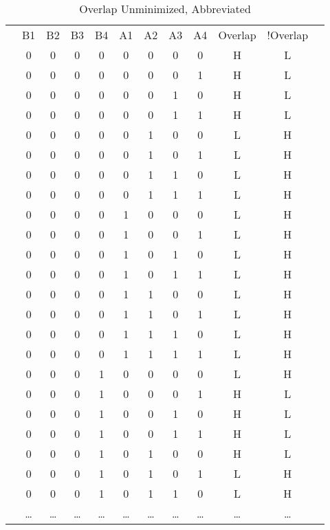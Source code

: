 \documentclass[letterpaper,titlepage,oneside]{article}
\begin{document}
\begin{table}[h!]
\begin{center}
\begin{tabular}{c|c|c|c|c|c|c|c|c|c|c|c}
\cline{2-11}

 & B1 & B2 & B3 & B4 & A1 & A2 & A3 & A4 & Overlap & !Overlap & \\ \cline{2-11}
 & 0 & 0 & 0 & 0 & 0 & 0 & 0 & 0 & H & L &   \\
 & 0 & 0 & 0 & 0 & 0 & 0 & 0 & 1 & H & L &   \\
 & 0 & 0 & 0 & 0 & 0 & 0 & 1 & 0 & H & L &   \\
 & 0 & 0 & 0 & 0 & 0 & 0 & 1 & 1 & H & L &   \\
 & 0 & 0 & 0 & 0 & 0 & 1 & 0 & 0 & L & H &   \\
 & 0 & 0 & 0 & 0 & 0 & 1 & 0 & 1 & L & H &   \\
 & 0 & 0 & 0 & 0 & 0 & 1 & 1 & 0 & L & H &   \\
 & 0 & 0 & 0 & 0 & 0 & 1 & 1 & 1 & L & H &   \\
 & 0 & 0 & 0 & 0 & 1 & 0 & 0 & 0 & L & H &   \\
 & 0 & 0 & 0 & 0 & 1 & 0 & 0 & 1 & L & H &   \\
 & 0 & 0 & 0 & 0 & 1 & 0 & 1 & 0 & L & H &   \\
 & 0 & 0 & 0 & 0 & 1 & 0 & 1 & 1 & L & H &   \\
 & 0 & 0 & 0 & 0 & 1 & 1 & 0 & 0 & L & H &   \\
 & 0 & 0 & 0 & 0 & 1 & 1 & 0 & 1 & L & H &   \\
 & 0 & 0 & 0 & 0 & 1 & 1 & 1 & 0 & L & H &   \\
 & 0 & 0 & 0 & 0 & 1 & 1 & 1 & 1 & L & H &   \\
 & 0 & 0 & 0 & 1 & 0 & 0 & 0 & 0 & L & H &   \\
 & 0 & 0 & 0 & 1 & 0 & 0 & 0 & 1 & H & L &   \\
 & 0 & 0 & 0 & 1 & 0 & 0 & 1 & 0 & H & L &   \\
 & 0 & 0 & 0 & 1 & 0 & 0 & 1 & 1 & H & L &   \\
 & 0 & 0 & 0 & 1 & 0 & 1 & 0 & 0 & H & L &   \\
 & 0 & 0 & 0 & 1 & 0 & 1 & 0 & 1 & L & H &   \\
 & 0 & 0 & 0 & 1 & 0 & 1 & 1 & 0 & L & H &   \\
 & \ldots & \ldots & \ldots & \ldots & \ldots & \ldots & \ldots & \ldots & \ldots & \ldots &  \\

\cline{2-11}
\end{tabular}
\caption{Overlap Unminimized, Abbreviated}\label{table:OverLap_Unminimized}

\end{center}
\end{table}
\end{document}
